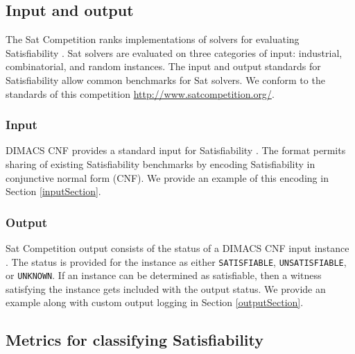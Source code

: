 	\subsection{Input and output}
	
	
 The {\sc Sat} Competition ranks implementations of solvers for evaluating {\sc Satisfiability} \cite{satcompetition}.  {\sc Sat} solvers are evaluated on three categories of input: industrial, combinatorial, and random instances.  The input and output standards for {\sc Satisfiability} allow common benchmarks for {\sc Sat} solvers.  We conform to the standards of this competition \url{http://www.satcompetition.org/}.  
 
		\subsubsection{Input}
		
DIMACS CNF provides a standard input for {\sc Satisfiability} \cite{dimacsFormat}.  The format permits sharing of existing {\sc Satisfiability} benchmarks by encoding {\sc Satisfiability} in conjunctive normal form (CNF).  We provide an example of this encoding in Section \ref{inputSection}.
		
		\subsubsection{Output}
		

{\sc Sat} Competition output consists of the status of a DIMACS CNF input instance \cite{satcompetition}.  The status is provided for the instance as either \texttt{SATISFIABLE}, \texttt{UNSATISFIABLE}, or \texttt{UNKNOWN}.  If an instance can be determined as satisfiable, then a witness satisfying the instance gets included with the output status.  We provide an example along with custom output logging in Section \ref{outputSection}.
	
	\subsection{Metrics for classifying {\sc Satisfiability}}

